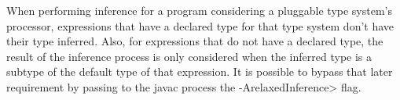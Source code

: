 When performing inference for a program considering a pluggable type system's
processor, expressions that have a declared type for that type system don't have
their type inferred. Also, for expressions that do not have a declared type,
the result of the inference process is only considered when the inferred type
is a subtype of the default type of that expression. It is possible to bypass
that later requirement by passing to the javac process the
\<-ArelaxedInference> flag.

